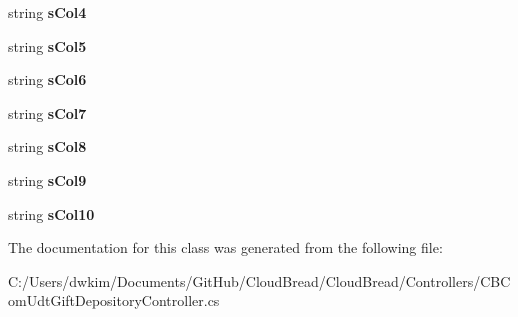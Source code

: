 \begin{DoxyCompactItemize}
\item 
string {\bfseries s\+Col4}\hypertarget{a00092_a27bca55a4e5a18fc2fc77c79ac3ce9e9}{}\label{a00092_a27bca55a4e5a18fc2fc77c79ac3ce9e9}

\item 
string {\bfseries s\+Col5}\hypertarget{a00092_acdaad2024428f93394f98003332be47b}{}\label{a00092_acdaad2024428f93394f98003332be47b}

\item 
string {\bfseries s\+Col6}\hypertarget{a00092_a51ab58915057e4214a1a5c255d80252e}{}\label{a00092_a51ab58915057e4214a1a5c255d80252e}

\item 
string {\bfseries s\+Col7}\hypertarget{a00092_ab43bfe2641353ec0eda34716cdd2d086}{}\label{a00092_ab43bfe2641353ec0eda34716cdd2d086}

\item 
string {\bfseries s\+Col8}\hypertarget{a00092_ad457c896d60ecc35a9bba7e038b78ced}{}\label{a00092_ad457c896d60ecc35a9bba7e038b78ced}

\item 
string {\bfseries s\+Col9}\hypertarget{a00092_a4840d65eef80346a26ef933f9d5c42de}{}\label{a00092_a4840d65eef80346a26ef933f9d5c42de}

\item 
string {\bfseries s\+Col10}\hypertarget{a00092_af10e605c373087ab258e1c12ba9af58d}{}\label{a00092_af10e605c373087ab258e1c12ba9af58d}

\end{DoxyCompactItemize}


The documentation for this class was generated from the following file\+:\begin{DoxyCompactItemize}
\item 
C\+:/\+Users/dwkim/\+Documents/\+Git\+Hub/\+Cloud\+Bread/\+Cloud\+Bread/\+Controllers/C\+B\+Com\+Udt\+Gift\+Depository\+Controller.\+cs\end{DoxyCompactItemize}
